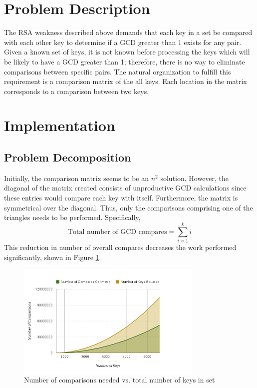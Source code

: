 \documentclass[10pt, conference]{./IEEEtran}
\begin{document}
\section{Problem Description}
The RSA weakness described above demands that each key in a set be 
compared with each other key to determine if a GCD greater than 1 exists for 
any pair. Given a known set of keys, it is not known before processing 
the keys which will be likely to have a GCD greater than 1; therefore, there 
is no way to eliminate comparisons between specific pairs. The natural 
organization to fulfill this requirement is a comparison matrix of the all 
keys. Each location in the matrix corresponds to a comparison between two 
keys.

\section{Implementation}
\subsection{Problem Decomposition}
Initially, the comparison matrix seems to be an $n^2$ solution. However, the 
diagonal of the matrix created consists of unproductive GCD calculations since 
these entries would compare each key with itself. Furthermore, the matrix is 
symmetrical over the diagonal. Thus, only the comparisons comprising one of 
the triangles needs to be performed. Specifically, 
\begin{equation}
   \label{eq:gcd}
   \mbox{Total number of GCD compares} = \sum_{i=1}^k i
\end{equation}
This reduction in number of overall compares decreases the work 
performed significantly, shown in Figure \ref{fig:compvkeys}. 

\begin{figure}
   \centering
   \includegraphics[width=3.5in]{chart_6.png}
   \caption{Number of comparisons needed vs. total number of keys in set}
   \label{fig:compvkeys}
\end{figure}
\end{document}
